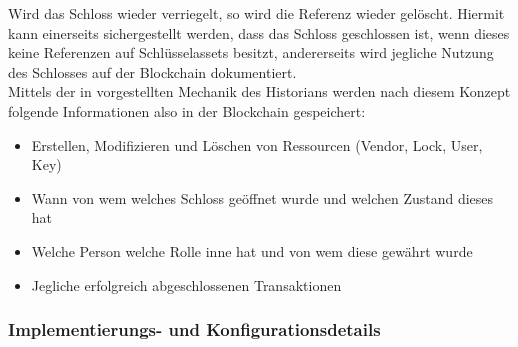        Wird das Schloss wieder verriegelt, so wird die Referenz wieder gelöscht. 
        Hiermit kann einerseits sichergestellt werden, dass das Schloss geschlossen ist, wenn dieses keine Referenzen auf Schlüsselassets besitzt, andererseits wird jegliche Nutzung des Schlosses auf der Blockchain dokumentiert. 
        \medskip\\
        \noindent Mittels der in  vorgestellten Mechanik des Historians werden nach diesem Konzept folgende Informationen also in der Blockchain gespeichert:
        \begin{itemize}[noitemsep]
            \item Erstellen, Modifizieren und Löschen von Ressourcen (Vendor, Lock, User, Key)
            \item Wann von wem welches Schloss geöffnet wurde und welchen Zustand dieses hat
            \item Welche Person welche Rolle inne hat und von wem diese gewährt wurde
            \item Jegliche erfolgreich abgeschlossenen Transaktionen
        \end{itemize}
        
    \subsubsection{Implementierungs- und Konfigurationsdetails}
    \label{sec:prototype_arch_impl}
